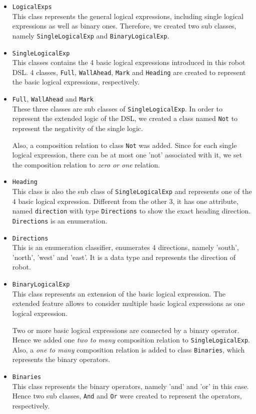 \documentclass[a4paper, 11pt]{article}
\begin{document}
\begin{itemize}
\item \texttt{LogicalExps} \\
This class represents the general logical expressions, including single logical expressions as well as binary ones. Therefore, we created two sub classes, namely \texttt{SingleLogicalExp} and \texttt{BinaryLogicalExp}. 

\item \texttt{SingleLogicalExp} \\
This classes contains the 4 basic logical expressions introduced in this robot DSL. 4 classes, \texttt{Full}, \texttt{WallAhead}, \texttt{Mark} and \texttt{Heading} are created to represent the basic logical expressions, respectively. 

\item \texttt{Full}, \texttt{WallAhead} and \texttt{Mark} \\
These three classes are sub classes of \texttt{SingleLogicalExp}. In order to represent the extended logic of the DSL, we created a class named \texttt{Not} to represent the negativity of the single logic. \bigbreak 

Also, a composition relation to class \texttt{Not} was added. Since for each single logical expression, there can be at most one 'not' associated with it, we set the composition relation to \textit{zero or one} relation. 

\item \texttt{Heading} \\
This class is also the sub class of \texttt{SingleLogicalExp} and represents one of the 4 basic logical expression. Different from the other 3, it has one attribute, named \texttt{direction} with type \texttt{Directions} to show the exact heading direction. \texttt{Directions} is an enumeration. 

\item \texttt{Directions} \\
This is an enumeration classifier, enumerates 4 directions, namely 'south', 'north', 'west' and 'east'. It is a data type and represents the direction of robot. 

\item \texttt{BinaryLogicalExp} \\
This class represents an extension of the basic logical expression. The extended feature allows to consider multiple basic logical expressions as one logical expression. \bigbreak

Two or more basic logical expressions are connected by a binary operator. Hence we added one \textit{two to many} composition relation to \texttt{SingleLogicalExp}. Also, a \textit{one to many} composition relation is added to class \texttt{Binaries}, which represents the binary operators. 

\item \texttt{Binaries} \\
This class represents the binary operators, namely 'and' and 'or' in this case. Hence two sub classes, \texttt{And} and \texttt{Or} were created to represent the operators, respectively. 
\end{itemize}
\end{document}
